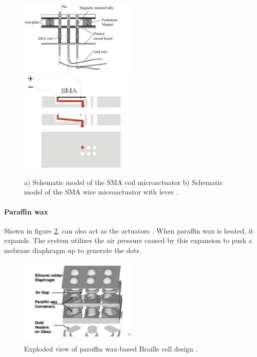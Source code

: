 \begin{figure}[h]\centering
    \includegraphics[width=0.5\textwidth]{figures/Coil_SMA_mechanism.png}
    \includegraphics[height=5cm]{figures/sma-mechanism.png}
    \caption[Schematics of Shaped Memory Alloy (SMA) mechanisms]{ a) Schematic model of the SMA coil microactuator b) Schematic model of the SMA wire microactuator with lever \cite{haga_dynamic_2005}.}
    \label{fig:sma}
\end{figure}

\paragraph{Paraffin wax}
Shown in figure \ref{fig:paraffin}, can also act as the actuators \cite{lee_micromachined_2005}. When paraffin wax is heated, it expands.
The system utilizes the air pressure caused by this expansion to push a mebrane diaphragm up to generate the dots.

\begin{figure}[h] \centering
    \includegraphics[width=0.5\textwidth]{figures/paraffin.png}
\caption[Paraffin-based Braille cell]{Exploded view of paraffin wax-based Braille cell design \cite{lee_micromachined_2005}.}
\label{fig:paraffin}
\end{figure}
